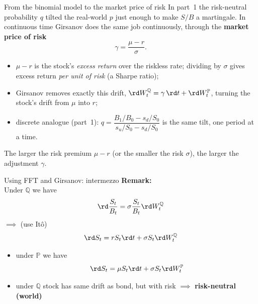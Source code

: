 \documentclass[pdf, handout]{beamer}
\begin{document}
\begin{frame}{From the binomial model to the market price of risk}
In part~1 the risk-neutral probability $q$ tilted the real-world $p$ just enough to make $S/B$ a martingale. In continuous time Girsanov does the same job continuously, through the \textbf{market price of risk}
\[ \gamma=\frac{\mu-r}{\sigma}. \]
\begin{itemize}
\item $\mu-r$ is the stock's \emph{excess return} over the riskless rate; dividing by $\sigma$ gives excess return \emph{per unit of risk} (a Sharpe ratio);
\item Girsanov removes exactly this drift, $\rd W^{\mathbb{Q}}_t=\gamma\,\rd t+\rd W^{\mathbb{P}}_t$, turning the stock's drift from $\mu$ into $r$;
\item discrete analogue (part~1): $q=\dfrac{B_1/B_0-s_d/S_0}{s_u/S_0-s_d/S_0}$ is the same tilt, one period at a time.
\end{itemize}
The larger the risk premium $\mu-r$ (or the smaller the risk $\sigma$), the larger the adjustment $\gamma$.
\end{frame}

\begin{frame}{Using FFT and Girsanov: intermezzo}
\textbf{Remark:} \\
Under $\mathbb{Q}$ we have
\[
\rd \frac{S_t}{B_t}=\sigma \frac{S_t}{B_t} \rd W_t^{\mathbb{Q}}
\]
$\implies$ (use It\^o)
\[
\rd S_t= rS_t \rd t + \sigma S_t \rd W_t^{\mathbb{Q}}
\]
\begin{itemize}
\item
 under $\mathbb{P}$ we have
\[
\rd S_t= \mu S_t \rd t + \sigma S_t \rd W_t^{\mathbb{P}}
\]
\item under $\mathbb{Q}$ stock has same drift as bond, but with risk $\implies$ \textbf{risk-neutral (world)}
\end{itemize}
\end{frame}
\end{document}
